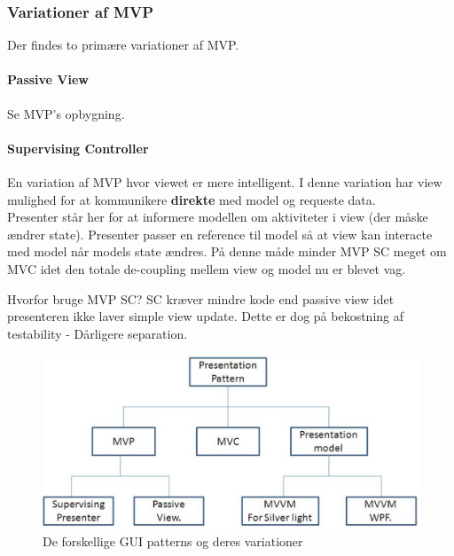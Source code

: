 \subsubsection{Variationer af MVP}
Der findes to primære variationer af MVP.

\paragraph{Passive View}
Se MVP's opbygning.

\paragraph{Supervising Controller}
En variation af MVP hvor viewet er mere intelligent. I denne variation har view mulighed for at kommunikere \textbf{direkte} med model og requeste data.\\

Presenter står her for at informere modellen om aktiviteter i view (der måske ændrer state). Presenter passer en reference til model så at view kan interacte med model når models state ændres. På denne måde minder MVP SC meget om MVC idet den totale de-coupling mellem view og model nu er blevet vag.

Hvorfor bruge MVP SC? SC kræver mindre kode end passive view idet presenteren ikke laver simple view update. Dette er dog på bekostning af testability - Dårligere separation.

\begin{figure}[h]
	\centering
	\includegraphics[width=0.8\linewidth]{figs/guiPatterns}
	\caption{De forskellige GUI patterns og deres variationer}
	\label{fig:guiPatterns}
\end{figure}
